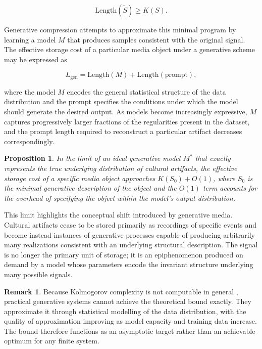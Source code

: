 \documentclass[12pt,a4paper]{article}
\theoremstyle{plain}
\newtheorem{proposition}[theorem]{Proposition}
\theoremstyle{definition}
\newtheorem{remark}[theorem]{Remark}
\begin{document}
\begin{equation}
\text{Length}(\tilde{S}) \geq K(S).
\end{equation}

Generative compression attempts to approximate this minimal program by learning a model $M$ that produces samples consistent with the original signal. The effective storage cost of a particular media object under a generative scheme may be expressed as

\begin{equation}
L_{\text{gen}} = \text{Length}(M) + \text{Length}(\text{prompt}),
\end{equation}

where the model $M$ encodes the general statistical structure of the data distribution and the prompt specifies the conditions under which the model should generate the desired output. As models become increasingly expressive, $M$ captures progressively larger fractions of the regularities present in the dataset, and the prompt length required to reconstruct a particular artifact decreases correspondingly.

\begin{proposition}
In the limit of an ideal generative model $M^*$ that exactly represents the true underlying distribution of cultural artifacts, the effective storage cost of a specific media object approaches $K(S_0) + O(1)$, where $S_0$ is the minimal generative description of the object and the $O(1)$ term accounts for the overhead of specifying the object within the model's output distribution.
\end{proposition}

This limit highlights the conceptual shift introduced by generative media. Cultural artifacts cease to be stored primarily as recordings of specific events and become instead instances of generative processes capable of producing arbitrarily many realizations consistent with an underlying structural description. The signal is no longer the primary unit of storage; it is an epiphenomenon produced on demand by a model whose parameters encode the invariant structure underlying many possible signals.

\begin{remark}
Because Kolmogorov complexity is not computable in general \cite{Li1997}, practical generative systems cannot achieve the theoretical bound exactly. They approximate it through statistical modelling of the data distribution, with the quality of approximation improving as model capacity and training data increase. The bound therefore functions as an asymptotic target rather than an achievable optimum for any finite system.
\end{remark}
\end{document}
